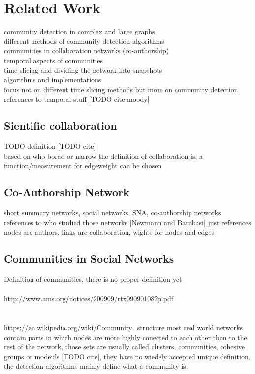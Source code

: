\documentclass[runningheads,a4paper]{llncs}
\begin{document}
\section{Related Work}
community detection in complex and large graphs\\
different methods of community detection algorithms\\
communities in collaboration networks (co-authorship)\\
temporal aspects of communities\\
time slicing and dividing the network into snapshots\\
algorithms and implementations\\
focus not on different time slicing methods but more on community detection\\
references to temporal stuff [TODO cite moody]

\subsection{Sientific collaboration}
TODO definition [TODO cite]\\
based on who borad or narrow the definition of collaboration is, a function/measurement for edgeweight can be chosen

\subsection{Co-Authorship Network}
short summary networks, social networks, SNA, co-authorship networks\\
references to who studied those networks [Newmann and Barabasi] just references\\
nodes are authors, links are collaboration, wights for nodes and edges\\

\subsection{Communities in Social Networks}
Definition of communities, there is no proper definition yet\\
\cite{girvan2002community}\\
\url{http://www.ams.org/notices/200909/rtx090901082p.pdf}\\
\cite{palla2005uncovering}\\
\cite{fortunato2010community}\\
\url{https://en.wikipedia.org/wiki/Community_structure}
most real world networks contain parts in which nodes are more highly conected to each other than to the rest of the network, those sets are usually called clusters, communities, cohesive groups or modeuls [TODO cite], they have no wiedely accepted unique definition. the detection algorithms mainly define what a community is.
\end{document}
